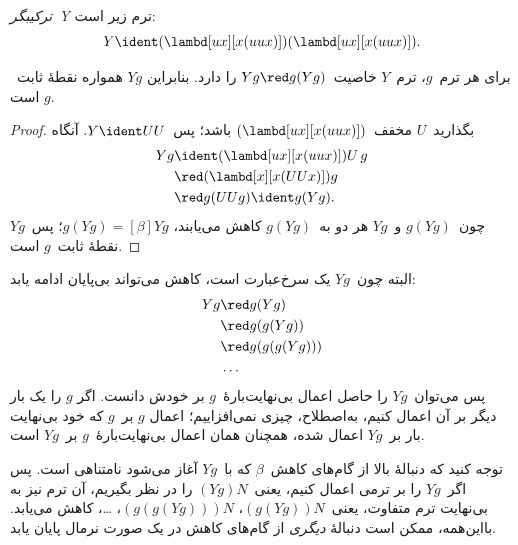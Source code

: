 \documentclass[../../../include/open-logic-section]{subfiles}
\begin{document}
\begin{defn}
  \emph{ترکیبگر~Y} ترم زیر است:
  \[
  Y \ident (\lambd[ux][x(uux)])(\lambd[ux][x(uux)]).
  \]
\end{defn}

\begin{thm}
  برای هر ترم~$g$، ترم~$Y$ خاصیت~$Yg \red g(Yg)$ را دارد. بنابراین
  $Yg$ همواره نقطهٔ ثابت~$g$ است.
\end{thm}

\begin{proof}
  بگذارید~$U$ مخفف~$(\lambd[ux][x(uux)])$ باشد؛ پس~$Y \ident UU$.
  آنگاه
  \begin{align*}
    Y g &\ident (\lambd[ux][x(uux)])U\,g \\
    &\red (\lambd[x][x(UUx)])g\\
    & \red g(UUg) \ident g(Yg).
  \end{align*}
  چون~$g(Yg)$ و~$Yg$ هر دو به~$g(Yg)$ کاهش می‌یابند،
  $g(Yg) \equal[\beta] Yg$؛ پس~$Yg$ نقطهٔ ثابت~$g$ است.
\end{proof}

البته چون~$Yg$ یک سرخ‌عبارت است، کاهش می‌تواند بی‌پایان ادامه یابد:
\begin{align*}
  Y g &\red g (Y g) \\
    &\red g (g (Y g)) \\
    &\red g(g (g (Y g)))\\
    &\ldots
\end{align*}
پس می‌توان~$Yg$ را حاصل اعمال بی‌نهایت‌بارهٔ~$g$ بر خودش دانست. اگر
$g$ را یک بار دیگر بر آن اعمال کنیم، به‌اصطلاح، چیزی نمی‌افزاییم؛ اعمال
$g$ بر~$g$ که خود بی‌نهایت بار بر~$Yg$ اعمال شده، همچنان همان اعمال
بی‌نهایت‌بارهٔ~$g$ بر~$Yg$ است.

توجه کنید که دنبالهٔ بالا از گام‌های کاهش~$\beta$ که با~$Yg$ آغاز می‌شود
نامتناهی است. پس اگر~$Yg$ را بر ترمی اعمال کنیم، یعنی~$(Yg)N$ را در
نظر بگیریم، آن ترم نیز به بی‌نهایت ترم متفاوت، یعنی~$(g(Yg))N$،
$(g(g(Yg)))N$، \dots، کاهش می‌یابد. بااین‌همه، ممکن است دنبالهٔ
\emph{دیگری} از گام‌های کاهش در یک صورت نرمال پایان یابد.
\end{document}
